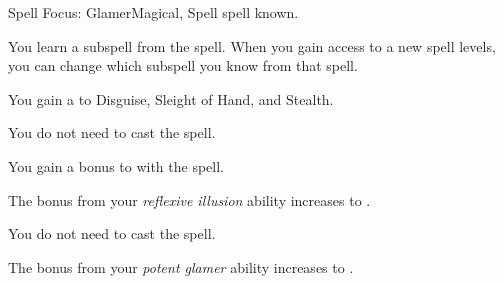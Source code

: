     \begin{feat}{Spell Focus: Glamer}{Magical, Spell}
        \featpre {} spell known.

         You learn a subspell from the  spell.
        When you gain access to a new spell levels, you can change which subspell you know from that spell.

         You gain a   to Disguise, Sleight of Hand, and Stealth.

         You do not need  to cast the  spell.

         You gain a  bonus to  with the  spell.

         The bonus from your \textit{reflexive illusion} ability increases to .

         You do not need  to cast the  spell.

         The bonus from your \textit{potent glamer} ability increases to .
    \end{feat}


